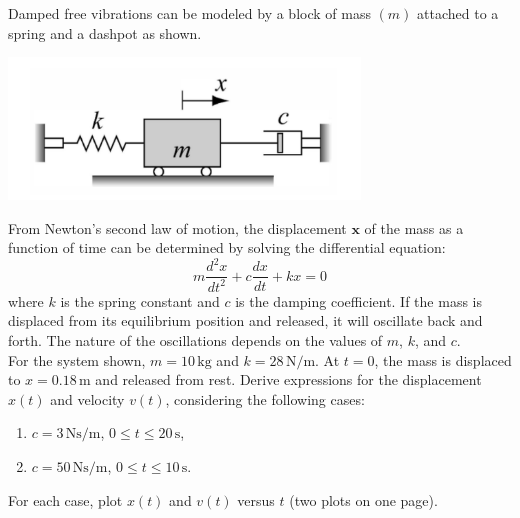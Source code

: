 \documentclass[a4paper, 12pt]{report}
\def\ni{green!60!black!40!white}
\begin{document}
\begin{tcolorbox}[title={\color{black}\section{Q3}}, colback=white, colframe=\ni, boxrule=1mm, width=1\textwidth]
    Damped free vibrations can be modeled by a block of mass \((m)\) attached to a spring and a dashpot as shown.\vspace{-1em}
    \begin{center}
        \includegraphics[width=0.7\textwidth]{main/graphs_images/3q.png}
    \end{center}
    From Newton's second law of motion, the displacement \(\mathbf{x}\) of the mass as a function of time can be determined by solving the differential equation:
    \[m \frac{d^2x}{dt^2} + c \frac{dx}{dt} + kx = 0\]
    where \(k\) is the spring constant and \(c\) is the damping coefficient. If the mass is displaced from its equilibrium position and released, it will oscillate back and forth. The nature of the oscillations depends on the values of \(m\), \(k\), and \(c\).\\[8pt]
    For the system shown, \(m = 10 \, \text{kg}\) and \(k = 28 \, \text{N/m}\). At \(t = 0\), the mass is displaced to \(x = 0.18 \, \text{m}\) and released from rest. Derive expressions for the displacement \(x(t)\) and velocity \(v(t)\), considering the following cases:
    \begin{enumerate}
        \item \(c = 3 \, \text{Ns/m}\), \(0 \leq t \leq 20 \, \text{s}\),
        \item \(c = 50 \, \text{Ns/m}\), \(0 \leq t \leq 10 \, \text{s}\).
    \end{enumerate}
    For each case, plot \(x(t)\) and \(v(t)\) versus \(t\) (two plots on one page).
\end{tcolorbox}
\end{document}
